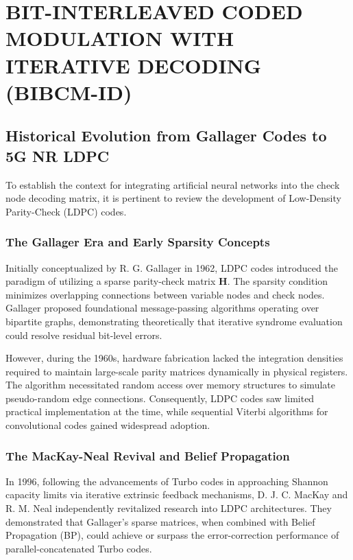 \documentclass[a4paper,14pt]{extreport}
\begin{document}
\chapter{BIT-INTERLEAVED CODED MODULATION WITH ITERATIVE DECODING (BIBCM-ID)}

\section{Historical Evolution from Gallager Codes to 5G NR LDPC}

To establish the context for integrating artificial neural networks into the check node decoding matrix, it is pertinent to review the development of Low-Density Parity-Check (LDPC) codes.

\subsection{The Gallager Era and Early Sparsity Concepts}
Initially conceptualized by R. G. Gallager in 1962, LDPC codes introduced the paradigm of utilizing a sparse parity-check matrix $\mathbf{H}$. The sparsity condition minimizes overlapping connections between variable nodes and check nodes. Gallager proposed foundational message-passing algorithms operating over bipartite graphs, demonstrating theoretically that iterative syndrome evaluation could resolve residual bit-level errors. 

However, during the 1960s, hardware fabrication lacked the integration densities required to maintain large-scale parity matrices dynamically in physical registers. The algorithm necessitated random access over memory structures to simulate pseudo-random edge connections. Consequently, LDPC codes saw limited practical implementation at the time, while sequential Viterbi algorithms for convolutional codes gained widespread adoption.

\subsection{The MacKay-Neal Revival and Belief Propagation}
In 1996, following the advancements of Turbo codes in approaching Shannon capacity limits via iterative extrinsic feedback mechanisms, D. J. C. MacKay and R. M. Neal independently revitalized research into LDPC architectures. They demonstrated that Gallager's sparse matrices, when combined with Belief Propagation (BP), could achieve or surpass the error-correction performance of parallel-concatenated Turbo codes.
\end{document}

